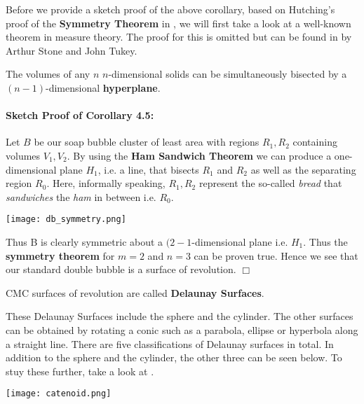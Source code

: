 \documentclass[a4paper,12pt]{report}
\begin{document}
Before we provide a sketch proof of the above corollary, based on Hutching's proof of the \textbf{Symmetry Theorem} in \cite{hutchings}, we will first take a look at a well-known theorem in measure theory. The proof for this is omitted but can be found in \cite{ham} by Arthur Stone and John Tukey. 

\begin{theorem}
The volumes of any $n$ $n$-dimensional solids can be simultaneously bisected by a $(n-1)$-dimensional \textbf{hyperplane}.
\end{theorem}

\paragraph{Sketch Proof of Corollary 4.5:} Let $B$ be our soap bubble cluster of least area with regions $R_{1}, R_{2}$ containing volumes $V_{1}, V_{2}$. By using the \textbf{Ham Sandwich Theorem} we can produce a one-dimensional plane $H_{1}$, i.e. a line, that bisects $R_{1}$ and $R_{2}$ as well as the separating region $R_{0}$. Here, informally speaking, $R_{1}, R_{2}$ represent the so-called \textit{bread} that \textit{sandwiches} the \textit{ham} in between i.e. $R_{0}$. 

\begin{center}
\texttt{[image: db\_symmetry.png]}
\end{center}

Thus B is clearly symmetric about a $(2-1$-dimensional plane i.e. $H_{1}$. Thus the \textbf{symmetry theorem} for $m=2$ and $n=3$ can be proven true. 
Hence we see that our standard double bubble is a surface of revolution. \hfill $\Box$

\begin{definition}
CMC surfaces of revolution are called \textbf{Delaunay Surfaces}.
\end{definition}

These Delaunay Surfaces include the sphere and the cylinder.
The other surfaces can be obtained by rotating a conic such as a parabola, ellipse or hyperbola along a straight line. There are five classifications of Delaunay surfaces in total. In addition to the sphere and the cylinder, the other three can be seen below. To stuy these further, take a look at \cite{del}.

\begin{center}
\texttt{[image: catenoid.png]}
\vspace{-1cm}
\end{center}
\end{document}
